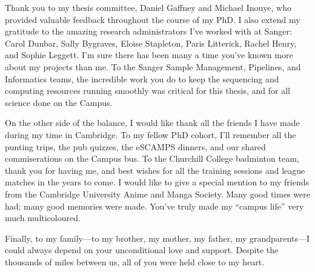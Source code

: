 Thank you to my thesis committee, Daniel Gaffney and Michael Inouye, who provided valuable feedback throughout the course of my PhD.
I also extend my gratitude to the amazing research administrators I've worked with at Sanger: Carol Dunbar, Sally Bygraves, Eloise Stapleton, Paris Litterick, Rachel Henry, and Sophie Leggett.
I'm sure there has been many a time you've known more about my projects than me. 
To the Sanger Sample Management, Pipelines, and Informatics teams,
the incredible work you do to keep the sequencing and computing resources running smoothly was critical for this thesis, and for all science done on the Campus.

On the other side of the balance, I would like thank all the friends I have made during my time in Cambridge.
To my fellow PhD cohort, 
I'll remember all the punting trips, the pub quizzes, the eSCAMPS dinners,
and our shared commiserations on the Campus bus.
To the Churchill College badminton team,
thank you for having me, and best wishes for all the training sessions and league matches in the years to come.
I would like to give a special mention to my friends from the Cambridge University Anime and Manga Society.
Many good times were had; many good memories were made.
You've truly made my \enquote{campus life} very much multicoloured.

Finally, to my family---to my brother, my mother, my father, my grandparents---I could always depend on your unconditional love and support.
Despite the thousands of miles between us, all of you were held close to my heart.
%
